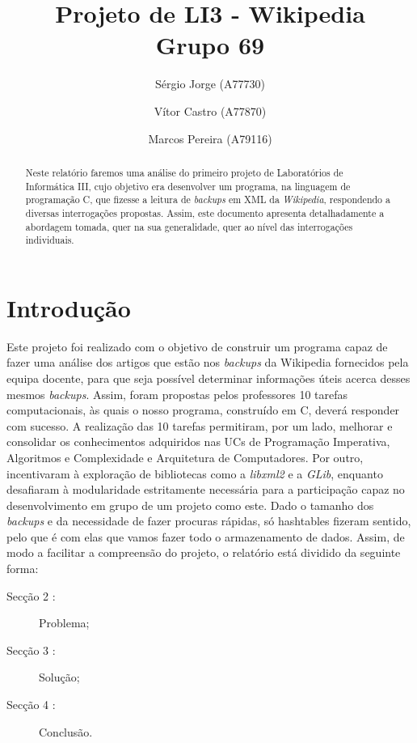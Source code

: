 \documentclass[a4paper]{article}
\title{Projeto de LI3 - Wikipedia\\Grupo 69}
\author{Sérgio Jorge (A77730) \and Vítor Castro (A77870) \and Marcos Pereira (A79116)}
\date{}
\begin{document}
\maketitle

\begin{abstract}
Neste relatório faremos uma análise do primeiro projeto de Laboratórios de Informática III, cujo objetivo era desenvolver um programa, na linguagem de programação C, que fizesse a leitura de \textit{backups} em XML da \textit{Wikipedia}, respondendo a diversas interrogações propostas. Assim, este documento apresenta detalhadamente a abordagem tomada, quer na sua generalidade, quer ao nível das interrogações individuais.
\end{abstract}

\tableofcontents

\section{Introdução}
\label{sec:intro}
Este projeto foi realizado com o objetivo de construir um programa capaz de fazer uma análise dos artigos que estão nos \textit{backups} da Wikipedia fornecidos pela equipa docente, para que seja possível determinar informações úteis acerca desses mesmos \textit{backups}.
Assim, foram propostas pelos professores 10 tarefas computacionais, às quais o nosso programa, construído em C, deverá responder com sucesso. A realização das 10 tarefas permitiram, por um lado, melhorar e consolidar os conhecimentos adquiridos nas UCs de Programação Imperativa, Algoritmos e Complexidade e Arquitetura de Computadores. Por outro, incentivaram à exploração de bibliotecas como a \textit{libxml2} e a \textit{GLib}, enquanto desafiaram à modularidade estritamente necessária para a participação capaz no desenvolvimento em grupo de um projeto como este.
Dado o tamanho dos \textit{backups} e da necessidade de fazer procuras rápidas, só hashtables fizeram sentido, pelo que é com elas que vamos fazer todo o armazenamento de dados.
Assim, de modo a facilitar a compreensão do projeto, o relatório está dividido da seguinte forma:
\begin{description}
    \item[Secção 2 :] Problema;
    \item[Secção 3 :] Solução;
    \item[Secção 4 :] Conclusão.
\end{description}
\end{document}
